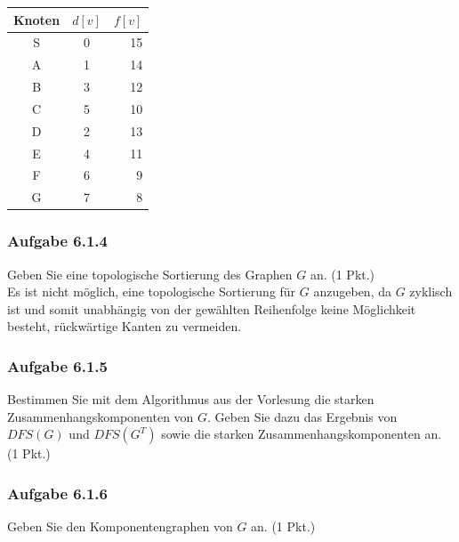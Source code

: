 \documentclass{article}
\begin{document}
\begin{minipage}[t]{0.22\textwidth}
\begin{tabular}{c||c|r}
\textbf{Knoten}	&	$d[v]$	&	$f[v]$	\\	\hline
S	&	0	&	15\\
A	&	1	&	14\\
B	&	3	&	12\\
C	&	5	&	10\\
D	&	2	&	13\\
E	&	4	&	11\\
F	&	6	&	9\\
G	&	7	&	8
\end{tabular}
\end{minipage}
\subsubsection*{Aufgabe 6.1.4}
\label{sssec:6.1.4}
Geben Sie eine topologische Sortierung des Graphen $G$ an. (1 Pkt.)
\vspace{1cm}\-\\
Es ist nicht möglich, eine topologische Sortierung für $G$ anzugeben, da $G$ zyklisch ist und somit unabhängig von der gewählten Reihenfolge keine Möglichkeit besteht, rückwärtige Kanten zu vermeiden.
\subsubsection*{Aufgabe 6.1.5}
\label{sssec:6.1.5}
Bestimmen Sie mit dem Algorithmus aus der Vorlesung die starken Zusammenhangskomponenten von $G$.
Geben Sie dazu das Ergebnis von $DFS(G)$ und $DFS(G^T)$ sowie die starken Zusammenhangskomponenten an. (1 Pkt.)
\vspace{1cm}\-\\

\subsubsection*{Aufgabe 6.1.6}
\label{sssec:6.1.6}
Geben Sie den Komponentengraphen von $G$ an. (1 Pkt.)
\vspace{1cm}\-\\
\end{document}
